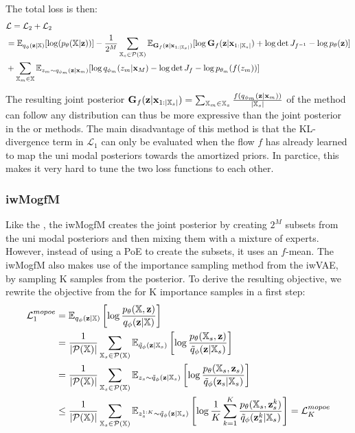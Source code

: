 The total loss is then:
\begin{equation}
    \begin{split}
        &\mathcal{L} = \mathcal{L}_2 + \mathcal{L}_2\\
        &= \mathbb{E}_{q_{\phi}(\textbf{z}|\mathbb{X})}[\log (p_{\theta}(\mathbb{X}|\textbf{z}))] - \frac{1}{2^M} \sum _{\mathbb{X}_s \in \mathcal{P}(\mathbb{X})} \mathbb{E}_{\textbf{G}_f(\textbf{z}|\textbf{x}_{1:|\mathbb{X}_s|})}[\log \textbf{G}_f(\textbf{z}|\textbf{x}_{1:|\mathbb{X}_s|}) + \log \det J_{f^{-1}}- \log p_{\theta}(\textbf{z}) ]\\
        &+ \sum _{\mathbb{X}_m \in \mathbb{X}} \mathbb{E}_{z_m \sim q_{\phi_m}(\textbf{z}|\textbf{x}_m)} [\log q_{\phi_m}(z_m|\textbf{x}_M) - \log \det J_f  - \log p_{\theta_m}(f(z_m))]
    \end{split}
\end{equation}

The resulting joint posterior $\textbf{G}_f(\textbf{z}|\textbf{x}_{1:|\mathbb{X}_s|}) =\sum _{\mathbb{X}_m \in \mathbb{X}_s} \frac{f(q_{\phi_m}(\textbf{z}|\textbf{x}_m))}{|\mathbb{X}_s|}$ of the  method can follow any distribution can thus be more expressive than the joint posterior in the  or  methods.
The main disadvantage of this method is that the KL-divergence term in $\mathcal{L}_1$ can only be evaluated when the flow $f$ has already learned to map the uni modal posteriors towards the amortized priors.
In parctice, this makes it very hard to tune the two loss functions to each other.

\subsubsection{iwMogfM}
Like the , the iwMogfM creates the joint posterior by creating $2^M$ subsets from the uni modal posteriors and then mixing them with a mixture of experts.
However, instead of using a PoE to create the subsets, it uses an $f$-mean.
The iwMogfM also makes use of the importance sampling method from the iwVAE, by sampling K samples from the posterior.
To derive the resulting objective, we rewrite the objective from the  for K importance samples in a first step:
\begin{equation}
    \begin{split}
        \mathcal{L}^{mopoe}_1 &= \mathbb{E}_{q_{\phi}(\textbf{z}|\mathbb{X})} \left[ \log \frac{p_{\theta}(\mathbb{X}, \textbf{z})}{q_{\phi}(\textbf{z}|\mathbb{X})} \right]\\
        &=\frac{1}{|\mathcal{P}(\mathbb{X})|} \sum _{\mathbb{X}_s \in \mathcal{P}(\mathbb{X})} \mathbb{E}_{\tilde{q}_{\phi}(\textbf{z}|\mathbb{X}_s)} \left[ \log \frac{p_{\theta}(\mathbb{X}_s, \textbf{z})}{\tilde{q}_{\phi}(\textbf{z}|\mathbb{X}_s)} \right]\\
        &=\frac{1}{|\mathcal{P}(\mathbb{X})|} \sum _{\mathbb{X}_s \in \mathcal{P}(\mathbb{X})} \mathbb{E}_{z_s \sim \tilde{q}_{\phi}(\textbf{z}|\mathbb{X}_s)} \left[ \log \frac{p_{\theta}(\mathbb{X}_s, \textbf{z}_s)}{\tilde{q}_{\phi}(\textbf{z}_s|\mathbb{X}_s)} \right]\\
        &\leq \frac{1}{|\mathcal{P}(\mathbb{X})|} \sum _{\mathbb{X}_s \in \mathcal{P}(\mathbb{X})} \mathbb{E}_{z^{1:K}_s \sim \tilde{q}_{\phi}(\textbf{z}|\mathbb{X}_s)} \left[ \log \frac{1}{K} \sum _{k=1}^K \frac{p_{\theta}(\mathbb{X}_s, \textbf{z}^k _s)}{\tilde{q}_{\phi}(\textbf{z}^k _s|\mathbb{X}_s)} \right] = \mathcal{L}^{mopoe}_K
    \end{split}
\end{equation}

